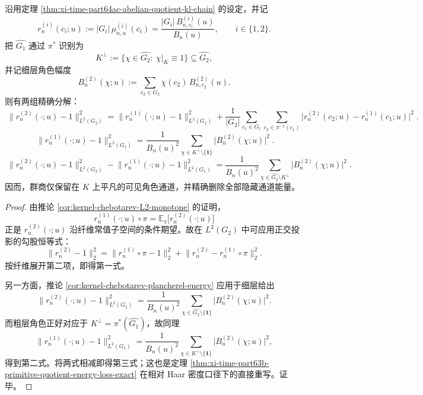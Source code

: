 \begin{theorem}[可见/隐藏角色能量的精确正交分解]\label{thm:xi-time-part64ac-visible-hidden-character-energy-splitting}
沿用定理 \ref{thm:xi-time-part64ac-abelian-quotient-kl-chain} 的设定，并记
\[
r_n^{(i)}(c_i;u):=|G_i|\,\mu_{n,u}^{(i)}(c_i)
=
\frac{|G_i|\,B_{n,c_i}^{(i)}(u)}{B_n(u)},
\qquad i\in\{1,2\}.
\]
把 \(\widehat{G_1}\) 通过 \(\pi^\ast\) 识别为
\[
K^\perp:=\{\chi\in \widehat{G_2}:\ \chi|_K\equiv 1\}\subseteq \widehat{G_2},
\]
并记细层角色幅度
\[
B_n^{(2)}(\chi;u):=\sum_{c_2\in G_2}\chi(c_2)\,B_{n,c_2}^{(2)}(u).
\]
则有两组精确分解：
\[
\boxed{\;
\bigl\|r_n^{(2)}(\cdot;u)-1\bigr\|_{L^2(G_2)}^2
=
\bigl\|r_n^{(1)}(\cdot;u)-1\bigr\|_{L^2(G_1)}^2
+
\frac{1}{|G_2|}
\sum_{c_1\in G_1}\sum_{c_2\in\pi^{-1}(c_1)}
\bigl|r_n^{(2)}(c_2;u)-r_n^{(1)}(c_1;u)\bigr|^2\; }.
\]
\[
\boxed{\;
\bigl\|r_n^{(1)}(\cdot;u)-1\bigr\|_{L^2(G_1)}^2
=
\frac{1}{B_n(u)^2}
\sum_{\chi\in K^\perp\setminus\{\mathbf{1}\}}
\bigl|B_n^{(2)}(\chi;u)\bigr|^2\; }.
\]
\[
\boxed{\;
\bigl\|r_n^{(2)}(\cdot;u)-1\bigr\|_{L^2(G_2)}^2
-
\bigl\|r_n^{(1)}(\cdot;u)-1\bigr\|_{L^2(G_1)}^2
=
\frac{1}{B_n(u)^2}
\sum_{\chi\in \widehat{G_2}\setminus K^\perp}
\bigl|B_n^{(2)}(\chi;u)\bigr|^2\; }.
\]
因而，群商仅保留在 \(K\) 上平凡的可见角色通道，并精确删除全部隐藏通道能量。
\end{theorem}
\begin{proof}
由推论 \ref{cor:kernel-chebotarev-L2-monotone} 的证明，
\[
r_n^{(1)}(\cdot;u)\circ\pi
=
\mathbb{E}_\pi\!\bigl[r_n^{(2)}(\cdot;u)\bigr]
\]
正是 \(r_n^{(2)}(\cdot;u)\) 沿纤维常值子空间的条件期望。故在 \(L^2(G_2)\) 中可应用正交投影的勾股恒等式：
\[
\bigl\|r_n^{(2)}-1\bigr\|_2^2
=
\bigl\|r_n^{(1)}\circ\pi-1\bigr\|_2^2
+
\bigl\|r_n^{(2)}-r_n^{(1)}\circ\pi\bigr\|_2^2.
\]
按纤维展开第二项，即得第一式。

另一方面，推论 \ref{cor:kernel-chebotarev-plancherel-energy} 应用于细层给出
\[
\bigl\|r_n^{(2)}(\cdot;u)-1\bigr\|_{L^2(G_2)}^2
=
\frac{1}{B_n(u)^2}
\sum_{\chi\in \widehat{G_2}\setminus\{\mathbf{1}\}}
\bigl|B_n^{(2)}(\chi;u)\bigr|^2.
\]
而粗层角色正好对应于 \(K^\perp=\pi^\ast(\widehat{G_1})\)，故同理
\[
\bigl\|r_n^{(1)}(\cdot;u)-1\bigr\|_{L^2(G_1)}^2
=
\frac{1}{B_n(u)^2}
\sum_{\chi\in K^\perp\setminus\{\mathbf{1}\}}
\bigl|B_n^{(2)}(\chi;u)\bigr|^2,
\]
得到第二式。将两式相减即得第三式；这也是定理
\ref{thm:xi-time-part63b-primitive-quotient-energy-loss-exact}
在相对 Haar 密度口径下的直接重写。证毕。
\end{proof}

